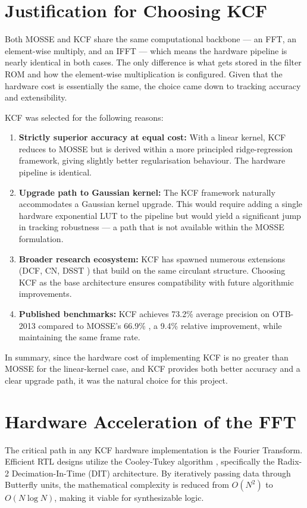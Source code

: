 \documentclass[a4paper,12pt]{report}
\begin{document}
\section{Justification for Choosing KCF}

Both MOSSE and KCF share the same computational backbone --- an FFT, an element-wise multiply, and an IFFT --- which means the hardware pipeline is nearly identical in both cases. The only difference is what gets stored in the filter ROM and how the element-wise multiplication is configured. Given that the hardware cost is essentially the same, the choice came down to tracking accuracy and extensibility.

KCF was selected for the following reasons:
\begin{enumerate}
    \item \textbf{Strictly superior accuracy at equal cost:} With a linear kernel, KCF reduces to MOSSE but is derived within a more principled ridge-regression framework, giving slightly better regularisation behaviour. The hardware pipeline is identical.
    \item \textbf{Upgrade path to Gaussian kernel:} The KCF framework naturally accommodates a Gaussian kernel upgrade. This would require adding a single hardware exponential LUT to the pipeline but would yield a significant jump in tracking robustness --- a path that is not available within the MOSSE formulation.
    \item \textbf{Broader research ecosystem:} KCF has spawned numerous extensions (DCF, CN, DSST \cite{danelljan2014}) that build on the same circulant structure. Choosing KCF as the base architecture ensures compatibility with future algorithmic improvements.
    \item \textbf{Published benchmarks:} KCF achieves 73.2\% average precision on OTB-2013 compared to MOSSE's 66.9\% \cite{henriques2015}, a 9.4\% relative improvement, while maintaining the same frame rate.
\end{enumerate}
In summary, since the hardware cost of implementing KCF is no greater than MOSSE for the linear-kernel case, and KCF provides both better accuracy and a clear upgrade path, it was the natural choice for this project.

\section{Hardware Acceleration of the FFT}
The critical path in any KCF hardware implementation is the Fourier Transform. Efficient RTL designs utilize the Cooley-Tukey algorithm \cite{cooleytukey1965}, specifically the Radix-2 Decimation-In-Time (DIT) architecture. By iteratively passing data through Butterfly units, the mathematical complexity is reduced from $O(N^2)$ to $O(N \log N)$, making it viable for synthesizable logic.
\end{document}
